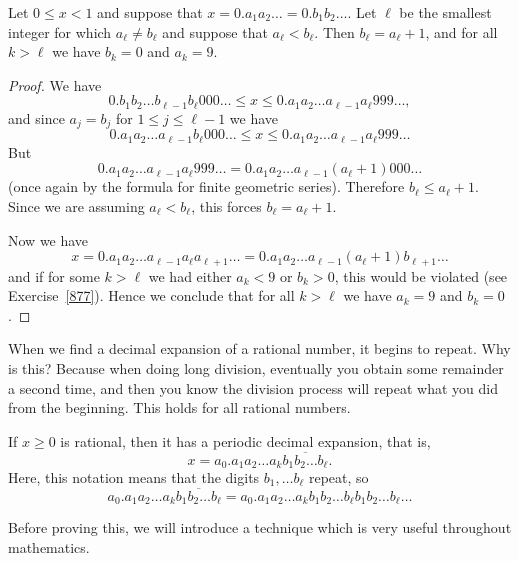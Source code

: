 \documentclass[11pt,dvipsnames]{book}
\numberwithin{figure}{section} %
\numberwithin{table}{section} %
\begin{document}
\begin{theorem}\label{83}
Let $0 \leq x <1$ and suppose that $x=0.a_{1}a_2\ldots =0.b_{1}b_{2}\dots$. Let $\ell$ be the smallest integer for which $a_{\ell}\neq b_{\ell}$ and suppose that $a_{\ell}<b_{\ell}$. Then $b_{\ell}=a_{\ell}+1$, and for all $k> \ell$ we have $b_{k}=0$ and $a_{k}=9$.
\end{theorem}

\begin{proof}
We have
\[ 0.b_{1}b_{2}\dots b_{\ell -1}b_{\ell}000 \ldots \leq x \leq 0.a_1 a_2 \dots a_{\ell - 1} a_{\ell} 999 \dots , \]
and since $a_j = b_j$ for $1 \leq j \leq \ell -1$ we have
\[0.a_1 a_2 \dots a_{\ell-1} b_{\ell}000\ldots \leq x \leq 0.a_1 a_2 \dots a_{\ell - 1} a_{\ell} 999 \dots \]
But
\[0.a_1 a_2 \dots a_{\ell - 1} a_{\ell} 999 \ldots = 0.a_1 a_2 \dots a_{\ell - 1} (a_{\ell} +1)000 \dots\]
(once again by the formula for finite geometric series).
Therefore $ b_{\ell} \leq a_{\ell} +1$. Since we are assuming $a_{\ell} < b_{\ell}$, this forces $b_{\ell} = a_{\ell} +1$.

Now we have
\[
x = 0.a_1 a_2 \dots a_{\ell - 1} a_{\ell} a_{\ell + 1} \ldots = 0.a_1 a_2 \dots a_{\ell - 1} (a_{\ell} + 1) b_{\ell + 1} \ldots
\]
and if for some $k > \ell$ we had either $a_k < 9$ or $b_k > 0$, this would be violated (see Exercise~\ref{877}). Hence we conclude that for all $k > \ell$ we have $a_k = 9$ and $b_k = 0$.
\end{proof}

When we find a decimal expansion of a rational number, it begins to repeat. Why is this? Because when doing long division, eventually you obtain some remainder a second time, and then you know the division process will repeat what you did from the beginning. This holds for all rational numbers.

\begin{lemma}
\label{l:rational->repeat}
If $x\geq 0$ is rational, then it has a periodic decimal expansion, that is,
\[
x=a_0.a_{1}a_{2}\dots a_{k} \overline{b_{1}b_{2}\dots b_{\ell}}.\]
Here, this notation means that the digits $b_{1}, \dots b_{\ell}$ repeat, so
\[
a_0.a_{1}a_{2}\ldots a_{k} \overline{b_{1}b_{2}\ldots b_{\ell}}
=a_0.a_{1}a_{2}\dots a_{k} {b_{1}b_{2}\dots b_{\ell}} {b_{1}b_{2}\dots b_{\ell}}\ldots
\]

\end{lemma}
\vspace{.5cm}
Before proving this, we will introduce a technique which is very useful throughout mathematics.
\vspace{.5cm}
\end{document}

